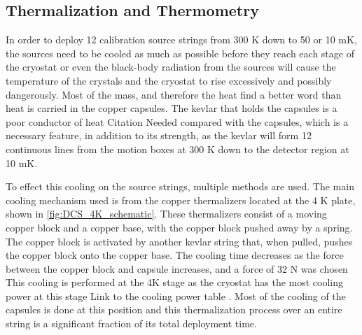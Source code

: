 \subsection{Thermalization and Thermometry}
In order to deploy 12 calibration source strings from 300 K down to 50 or 10 mK, the sources need to be cooled as much as possible before they reach each stage of the cryostat or even the black-body radiation from the sources will cause the temperature of the crystals and the cryostat to rise excessively and possibly dangerously. Most of the mass, and therefore the heat \color{red} find a better word than heat \color{black} is carried in the copper capsules. The kevlar that holds the capsules is a poor conductor of heat \color{red} Citation Needed \color{black} compared with the capsules, which is a necessary feature, in addition to its strength, as the kevlar will form 12 continuous lines from the motion boxes at 300 K down to the detector region at 10 mK.

To effect this cooling on the source strings, multiple methods are used. The main cooling mechanism used is from the copper thermalizers located at the 4 K plate, shown in \autoref{fig:DCS_4K_schematic}. These thermalizers consist of a moving copper block and a copper base, with the copper block pushed away by a spring. The copper block is activated by another kevlar string that, when pulled, pushes the copper block onto the copper base. The cooling time decreases as the force between the copper block and capsule increases, and a force of 32 N was chosen This cooling is performed at the 4K stage as the cryostat has the most cooling power at this stage \color{red} Link to the cooling power table \color{black}. Most of the cooling of the capsules is done at this position and this thermalization process over an entire string is a significant fraction of its total deployment time.


